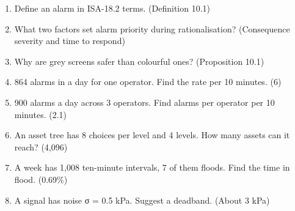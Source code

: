 
\begin{enumerate}
\item Define an alarm in ISA-18.2 terms. (Definition 10.1)
\item What two factors set alarm priority during rationalisation? (Consequence severity and time to respond)
\item Why are grey screens safer than colourful ones? (Proposition 10.1)
\item 864 alarms in a day for one operator. Find the rate per 10 minutes. (6)
\item 900 alarms a day across 3 operators. Find alarms per operator per 10 minutes. (2.1)
\item An asset tree has 8 choices per level and 4 levels. How many assets can it reach? (4,096)
\item A week has 1,008 ten-minute intervals, 7 of them floods. Find the time in flood. (0.69\%)
\item A signal has noise σ = 0.5 kPa. Suggest a deadband. (About 3 kPa)
\end{enumerate}
